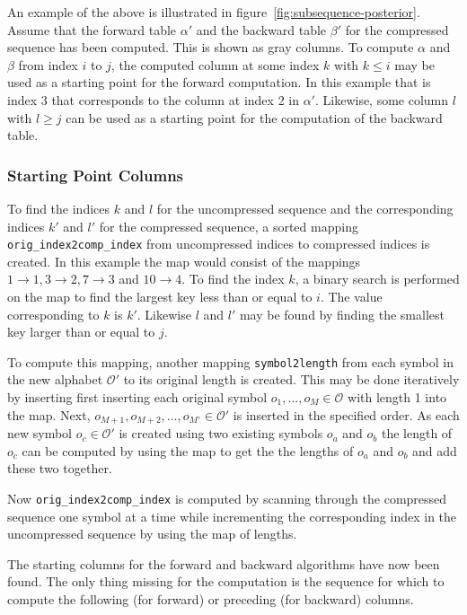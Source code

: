 An example of the above is illustrated in
figure~\ref{fig:subsequence-posterior}. Assume that the forward table $\alpha'$
and the backward table $\beta'$ for the compressed sequence has been computed.
This is shown as gray columns. To compute $\alpha$ and $\beta$ from index $i$
to $j$, the computed column at some index $k$ with $k \le i$ may be used as a
starting point for the forward computation. In this example that is index 3
that corresponds to the column at index 2 in $\alpha'$. Likewise, some column
$l$ with $l \ge j$ can be used as a starting point for the
computation of the backward table.

\subsubsection{Starting Point Columns}

To find the indices $k$ and $l$ for the uncompressed sequence and the
corresponding indices $k'$ and $l'$ for the compressed sequence, a sorted
mapping \texttt{orig\_index2comp\_index} from uncompressed indices to
compressed indices is created. In this example the map would consist of the
mappings $1 \rightarrow 1, 3 \rightarrow 2, 7 \rightarrow 3$ and
$10 \rightarrow 4$. To find the index $k$, a binary search is performed on the
map to find the largest key less than or equal to $i$. The value corresponding
to $k$ is $k'$. Likewise $l$ and $l'$ may be found by finding the smallest key
larger than or equal to $j$.

To compute this mapping, another mapping \texttt{symbol2length} from each
symbol in the new alphabet $\mathcal{O'}$ to its original length is
created. This may be done iteratively by inserting first inserting each
original symbol $o_1, \dots, o_M \in \mathcal{O}$ with length 1 into the
map. Next, $o_{M+1}, o_{M+2}, \dots, o_{M'} \in \mathcal{O'}$ is inserted in
the specified order. As each new symbol $o_c \in \mathcal{O'}$ is created using
two existing symbols $o_a$ and $o_b$ the length of $o_c$ can be computed by
using the map to get the the lengths of $o_a$ and $o_b$ and add these two
together.

Now \texttt{orig\_index2comp\_index} is computed by scanning through the
compressed sequence one symbol at a time while incrementing the corresponding
index in the uncompressed sequence by using the map of lengths.

The starting columns for the forward and backward algorithms have now been
found. The only thing missing for the computation is the sequence for which to
compute the following (for forward) or preceding (for backward) columns.

